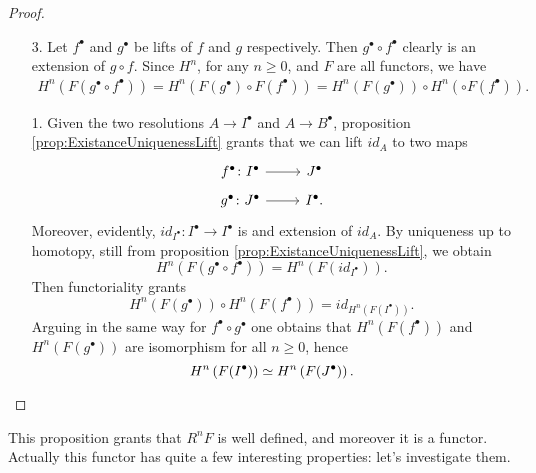 \documentclass[../Main]{subfiles}
\begin{document}
\begin{proof}
\begin{enumerate}
	\item[3.] Let $f^\bullet$ and $g^\bullet$ be lifts of $f$ and $g$ respectively.
		Then $g^\bullet \circ f^\bullet$ clearly is an extension of $g \circ f$.
		Since $H^n$, for any $n \geq 0$, and $F$ are all functors, we have
		\begin{align}
			H^{n} \left( F(g^\bullet \circ f^\bullet) \right) = 
			H^{n} \left( F(g^\bullet) \circ F(f^\bullet) \right) = 
			H^{n} \left( F(g^\bullet)\right) \circ H^{n} \left( \circ F(f^\bullet) \right)
		.\end{align} 
	\item[1.] Given the two resolutions $A \to I^\bullet$ and $A \to B^\bullet$, 
		proposition \ref{prop:ExistanceUniquenessLift} grants that
		we can lift $id_A$ to two maps
		\begin{equation}
			\begin{tikzcd}[row sep=tiny]
			f^\bullet\colon I^\bullet \arrow[r, "", rightarrow] &
			J^\bullet\\
			g^\bullet\colon J^\bullet \arrow[r, "", rightarrow] &
			I^\bullet.
		\end{tikzcd}
		\end{equation} 
		Moreover, evidently, 
		$id_{I^\bullet}\colon I^\bullet \to I^\bullet$
		is and extension of $id_A$.
		By uniqueness up to homotopy, still from proposition
		\ref{prop:ExistanceUniquenessLift}, we obtain
		\begin{equation}
			H^{n} \left( F(g^\bullet \circ f^\bullet) \right) =
			H^{n} \left( F(id_{I^\bullet}) \right)
		.\end{equation} 
		Then functoriality grants
		\begin{equation}
			H^{n} \left( F(g^\bullet) \right) \circ H^{n} \left( F(f^\bullet) \right) =
			id_{H^{n} \left( F(I^\bullet) \right)}
		.\end{equation} 
		Arguing in the same way for $f^\bullet \circ g^\bullet$ one obtains that
		$H^{n} \left( F(f^\bullet) \right)$ and 
		$H^{n} \left( F(g^\bullet) \right)$ are isomorphism for all $n \geq 0$, hence
		\begin{equation}
			H^{n} \left( F(I^\bullet) \right) \simeq H^{n} \left( F(J^\bullet) \right)
		.\qedhere\end{equation} 
\end{enumerate}
\end{proof}

\begin{rem}[]
	This proposition grants that $R^{n}F$ is well defined, and moreover it is a functor.
	Actually this functor has quite a few interesting properties: let's investigate them.
\end{rem}
\end{document}
